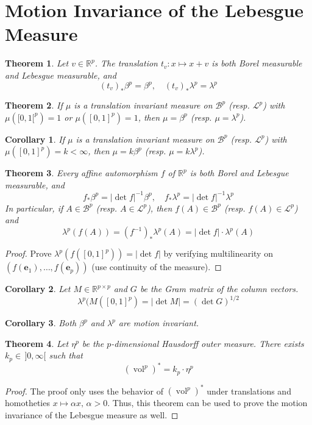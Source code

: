 \documentclass[11pt, a4paper, openany]{book}
\newtheorem{thm}{Theorem}\newtheorem{lem}{Lemma}\newtheorem{crl}{Corollary}
\theoremstyle{definition}
\DeclareMathOperator{\vol}{vol}
\begin{document}
\section{Motion Invariance of the Lebesgue Measure}
    \begin{thm}
        Let $v\in\mathbb{R}^p$. The translation $t_v:x\mapsto x+v$ is both Borel measurable and Lebesgue measurable, and
        \[
            (t_v)_*\beta^p=\beta^p,\quad (t_v)_*\lambda^p=\lambda^p
        \]
    \end{thm}
    \begin{thm}
        If $\mu$ is a translation invariant measure on $\mathscr{B}^p$ (resp. $\mathscr{L}^p$) with $\mu([0,1[^p)=1$ or $\mu([0,1]^p)=1$, then $\mu=\beta^p$ (resp. $\mu=\lambda^p$).
    \end{thm}
    \begin{crl}
        If $\mu$ is a translation invariant measure on $\mathscr{B}^p$ (resp. $\mathscr{L}^p$) with $\mu([0,1]^p)=k<\infty$, then $\mu=k\beta^p$ (resp. $\mu=k\lambda^p$).
    \end{crl}
    \begin{thm}
        Every affine automorphism $f$ of $\mathbb{R}^p$ is both Borel and Lebesgue measurable, and
        \[
            f_*\beta^p=|\det f|^{-1}\beta^p,\quad f_*\lambda^p=|\det f|^{-1}\lambda^p
        \]
        In particular, if $A\in\mathscr{B}^p$ (resp. $A\in\mathscr{L}^p$), then $f(A)\in\mathscr{B}^p$ (resp. $f(A)\in\mathscr{L}^p$) and
        \[
            \lambda^p(f(A))=(f^{-1})_*\lambda^p(A)=|\det f|\cdot \lambda^p(A)
        \]
    \end{thm}
    \begin{proof}
        Prove $\lambda^p(f([0,1]^p))=|\det f|$ by verifying multilinearity on $(f(\mathbf{e}_1),\dots, f(\mathbf{e}_p))$ (use continuity of the measure).
    \end{proof}
    \begin{crl}
        Let $M\in\mathbb{R}^{p\times p}$ and $G$ be the Gram matrix of the column vectors.
        \[
            \lambda^p(M([0,1]^p)=|\det M|=(\det G)^{1/2}
        \]
    \end{crl}
    \begin{crl}
        Both $\beta^p$ and $\lambda^p$ are motion invariant.
    \end{crl}
    \begin{thm}
        Let $\eta^p$ be the $p$-dimensional Hausdorff outer measure. There exists $k_p\in \,]0,\infty[$ such that
        \[
            (\vol^p)^*=k_p\cdot \eta^p
        \]
    \end{thm}
    \begin{proof}
        The proof only uses the behavior of $(\vol^p)^*$ under translations and homotheties $x\mapsto \alpha x,\,\alpha>0$. Thus, this theorem can be used to prove the motion invariance of the Lebesgue measure as well.
    \end{proof}
\end{document}
